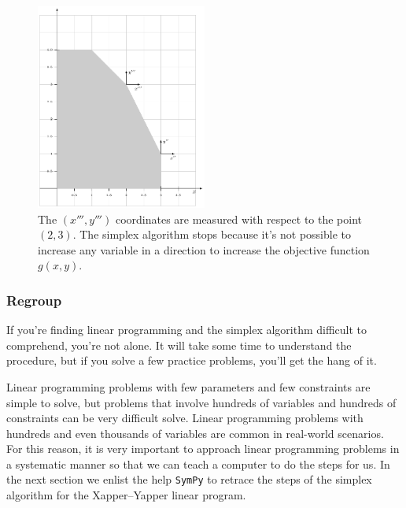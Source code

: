 \documentclass[11pt,oneside]{article}
\begin{document}
		\begin{figure}[htb]
		\begin{center}
		\includegraphics[width=0.5\textwidth]{figures/linear_algebra/linear_programming_4.pdf}
		\end{center}
		\vspace{-3mm}
		\caption{The $(x''',y''')$ coordinates are measured with respect to the point $(2,3)$. 
				The simplex algorithm stops because it's not possible to increase any variable 
				in a direction to increase the objective function $g(x,y)$.}
		\label{fig:linear_programming_4}
		\end{figure}
		


	\subsubsection{Regroup}

		If you're finding linear programming and the simplex algorithm difficult to comprehend,
		you're not alone. 
		It will take some time to understand the procedure,
		but if you solve a few practice problems, you'll get the hang of it.
			
		Linear programming problems with few parameters and few constraints are simple to solve, 
		but problems that involve hundreds of variables and hundreds of constraints can be very difficult solve.
		Linear programming problems with hundreds and even thousands of variables are common in real-world scenarios.
		For this reason, it is very important to approach linear programming problems 
		in a systematic manner so that we can teach a computer to do the steps for us.
		In the next section we enlist the help \texttt{SymPy} to retrace the steps of the simplex algorithm for the Xapper--Yapper linear program.
				
\end{document}
